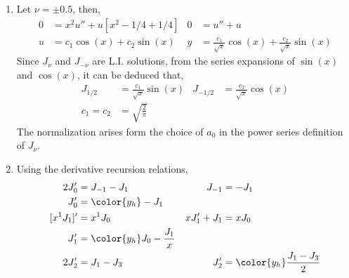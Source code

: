 \begin{enumerate}
    \item Let $ \nu = \pm 0.5 $, then,
          \begin{align}
              0 & = x^2 u'' + u\left[ x^2 - 1/4 + 1/4 \right]                   &
              0 & = u'' + u                                                       \\
              u & = c_1 \cos(x) + c_2 \sin(x)                                   &
              y & = \frac{c_1}{\sqrt{x}} \cos(x) + \frac{c_2}{\sqrt{x}} \sin(x)
          \end{align}
          Since $ J_\nu $ and $ J_{-\nu} $ are L.I. solutions, from the series expansions
          of $ \sin(x) $ and $ \cos(x) $, it can be deduced that,
          \begin{align}
              J_{1/2}   & = \frac{c_1}{\sqrt{x}} \sin(x) &
              J_{-1/2}  & = \frac{c_2}{\sqrt{x}} \cos(x)   \\
              c_1 = c_2 & = \sqrt{\frac{2}{\pi}}
          \end{align}
          The normalization arises form the choice of $ a_0 $ in the power series
          definition of $ J_\nu $.

    \item Using the derivative recursion relations,
          \begin{align}
              2J_0'       & = J_{-1} - J_1                    &
              J_{-1}      & = -J_1                              \\
              J_0'        & = \color{y_h} -J_1                  \\
              [x^{1}J_1]' & = x^{1}J_0                        &
              xJ_1' + J_1 & = xJ_0                              \\
              J_1'        & = \color{y_h} J_0 - \frac{J_1}{x}   \\
              2J_2'       & = J_1 - J_3                       &
              J_2'        & = \color{y_h} \frac{J_1 - J_3}{2}
          \end{align}


\end{enumerate}
